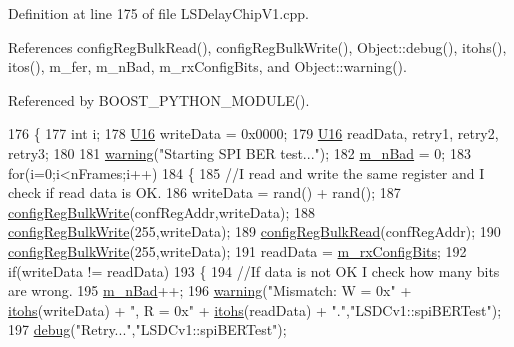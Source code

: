 Definition at line 175 of file L\+S\+Delay\+Chip\+V1.\+cpp.



References config\+Reg\+Bulk\+Read(), config\+Reg\+Bulk\+Write(), Object\+::debug(), itohs(), itos(), m\+\_\+fer, m\+\_\+n\+Bad, m\+\_\+rx\+Config\+Bits, and Object\+::warning().



Referenced by B\+O\+O\+S\+T\+\_\+\+P\+Y\+T\+H\+O\+N\+\_\+\+M\+O\+D\+U\+L\+E().


\begin{DoxyCode}
176 \{
177     \textcolor{keywordtype}{int} i;
178     \hyperlink{ICECALv3_8h_adf928e51a60dba0df29d615401cc55a8}{U16} writeData = 0x0000;
179     \hyperlink{ICECALv3_8h_adf928e51a60dba0df29d615401cc55a8}{U16} readData, retry1, retry2, retry3;
180 
181     \hyperlink{classObject_a65cd4fda577711660821fd2cd5a3b4c9}{warning}(\textcolor{stringliteral}{"Starting SPI BER test..."});
182     \hyperlink{classLSDelayChipV1_a425c69ef8f3d64d93cb1c86b83bbceec}{m\_nBad} = 0;
183     \textcolor{keywordflow}{for}(i=0;i<nFrames;i++)
184     \{
185         \textcolor{comment}{//I read and write the same register and I check if read data is OK.}
186         writeData = rand() + rand();    
187         \hyperlink{classLSDelayChipV1_afa626b5d52f8723bcaa3205d1cc7a0f8}{configRegBulkWrite}(confRegAddr,writeData);
188 \hyperlink{classLSDelayChipV1_afa626b5d52f8723bcaa3205d1cc7a0f8}{configRegBulkWrite}(255,writeData);
189         \hyperlink{classLSDelayChipV1_a97a50092ce40f6322db946fc580f7230}{configRegBulkRead}(confRegAddr);    
190 \hyperlink{classLSDelayChipV1_afa626b5d52f8723bcaa3205d1cc7a0f8}{configRegBulkWrite}(255,writeData);
191         readData = \hyperlink{classLSDelayChipV1_ae049797212539b231b9722ae69a0491d}{m\_rxConfigBits};
192         \textcolor{keywordflow}{if}(writeData != readData)
193         \{
194             \textcolor{comment}{//If data is not OK I check how many bits are wrong.}
195             \hyperlink{classLSDelayChipV1_a425c69ef8f3d64d93cb1c86b83bbceec}{m\_nBad}++;
196             \hyperlink{classObject_a65cd4fda577711660821fd2cd5a3b4c9}{warning}(\textcolor{stringliteral}{"Mismatch: W = 0x"} + \hyperlink{classLSDelayChipV1_af7f4d72fb404b6b3d7b41fd01876ed0a}{itohs}(writeData) + \textcolor{stringliteral}{", R = 0x"} + 
      \hyperlink{classLSDelayChipV1_af7f4d72fb404b6b3d7b41fd01876ed0a}{itohs}(readData) + \textcolor{stringliteral}{"."},\textcolor{stringliteral}{"LSDCv1::spiBERTest"});
197             \hyperlink{classObject_aac010553f022165573714b7014a15f0d}{debug}(\textcolor{stringliteral}{"Retry..."},\textcolor{stringliteral}{"LSDCv1::spiBERTest"});

\end{DoxyCode}
